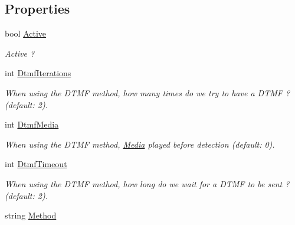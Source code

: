 \subsection*{Properties}
\begin{DoxyCompactItemize}
\item 
bool \hyperlink{class_thecallr_api_1_1_objects_1_1_app_1_1_param_1_1_vms_detect_a527c2a06b36239e17596985ce2800156}{Active}
\begin{DoxyCompactList}\small\item\em Active ? \end{DoxyCompactList}\item 
int \hyperlink{class_thecallr_api_1_1_objects_1_1_app_1_1_param_1_1_vms_detect_a193b79af662c3dfe40f97a8a96e9da8b}{Dtmf\+Iterations}
\begin{DoxyCompactList}\small\item\em When using the D\+T\+M\+F method, how many times do we try to have a D\+T\+M\+F ? (default\+: 2). \end{DoxyCompactList}\item 
int \hyperlink{class_thecallr_api_1_1_objects_1_1_app_1_1_param_1_1_vms_detect_a298062aebb728726f144584ac3e74a81}{Dtmf\+Media}
\begin{DoxyCompactList}\small\item\em When using the D\+T\+M\+F method, \hyperlink{namespace_thecallr_api_1_1_objects_1_1_media}{Media} played before detection (default\+: 0). \end{DoxyCompactList}\item 
int \hyperlink{class_thecallr_api_1_1_objects_1_1_app_1_1_param_1_1_vms_detect_a53e8d617ee0f2ec11d8558dc2281916f}{Dtmf\+Timeout}
\begin{DoxyCompactList}\small\item\em When using the D\+T\+M\+F method, how long do we wait for a D\+T\+M\+F to be sent ? (default\+: 2). \end{DoxyCompactList}\item 
string \hyperlink{class_thecallr_api_1_1_objects_1_1_app_1_1_param_1_1_vms_detect_a28bb04ac4daf562d199331ca3ca7d89a}{Method}

\end{DoxyCompactItemize}
